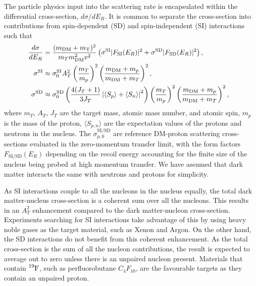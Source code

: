 The particle physics input into the scattering rate is encapsulated within the differential cross-section, $d\sigma/dE_R$. It is common to separate the cross-section into contributions from spin-dependent (SD) and spin-independent (SI) interactions such that
\begin{align}
    \frac{d\sigma}{dE_R} & = \frac{(m_\mathrm{DM} + m_\mathrm{T})^2}{ m_T m_\mathrm{DM}^2 v^2}\left(\sigma^\mathrm{SI}|F_\mathrm{SI}(E_R)|^2 + \sigma^\mathrm{SD}|F_\mathrm{SD}(E_R)|^2\right),\\
    \sigma^\mathrm{SI} & \approx   \sigma^\mathrm{SI}_{0}A_T^2\left(\frac{m_T}{m_p}\right)^2 \left( \frac{m_\mathrm{DM} + m_p}{m_\mathrm{DM} + m_T}\right)^2,\\
    \sigma^\mathrm{SD} & \approx \sigma^\mathrm{SD}_{0}\left( \frac{4(J_T + 1)}{3 J_T}\left| \langle S_p\rangle + \langle S_n\rangle \right|^2 \right) \left(\frac{m_T}{m_p}\right)^2 \left( \frac{m_\mathrm{DM} + m_p}{m_\mathrm{DM} + m_T}\right)^2,
\end{align}
where $m_T$, $A_T$, $J_T$ are the target mass, atomic mass number, and atomic spin, $m_p$ is the mass of the proton, $\langle S_{p,n}\rangle$ are the expectation values of the protons and neutrons in the nucleus. The $\sigma^{\mathrm{SI/SD}}_{p,0}$ are reference DM-proton scattering cross-sections evaluated in the zero-momentum transfer limit, with the form factors $F_{\mathrm{SI/SD}}(E_R)$ depending on the recoil energy accounting for the finite size of the nucleus being probed at high momentum transfer.
We have assumed that dark matter interacts the same with neutrons and protons for simplicity. 

As SI interactions couple to all the nucleons in the nucleus equally, the total dark matter-nucleus cross-section is a coherent sum over all the nucleons. This results in an $A_T^2$ enhancement compared to the dark matter-nucleon cross-section. Experiments searching for SI interactions take advantage of this by using heavy noble gases as the target material, such as Xenon and Argon. On the other hand, the SD interactions do not benefit from this coherent enhancement. As the total cross-section is the sum of all the nucleon contributions, the result is expected to average out to zero unless there is an unpaired nucleon present. Materials that contain $\ce{^{19}F}$, such as perfluorobutane $C_4F_{10}$, are the favourable targets as they contain an unpaired proton.


